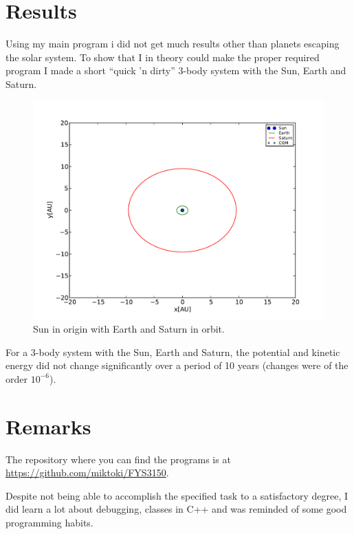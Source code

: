 \documentclass{article} %
\begin{document}
\section{Results}
Using my main program i did not get much results other than planets escaping the solar system. To show that I in theory could make the proper required program
I made a short ``quick 'n dirty'' 3-body system with the Sun, Earth and Saturn.
\begin{figure}[h]
	\includegraphics[width=\linewidth]{out}
	\caption{Sun in origin with Earth and Saturn in orbit.}
	\label{fig:simple}
\end{figure}
 For a 3-body system with the Sun, Earth and Saturn, the potential and kinetic energy did not change significantly over a period of 10 years
 (changes were of the order $10^{-6}$).

\section{Remarks}
The repository where you can find the programs is at \url{https://github.com/miktoki/FYS3150}.


Despite not being able to accomplish the specified task to a satisfactory degree, 
I did learn a lot about debugging, classes in C++ and was reminded of some good programming habits.

%
%

\end{document}
